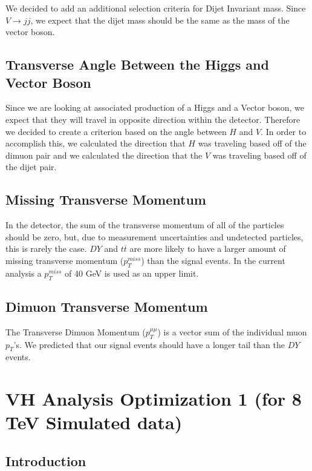 \documentclass[12pt]{article}
\begin{document}
We decided to add an additional selection criteria for Dijet Invariant mass. 
Since $V \rightarrow jj$, we expect that the dijet mass should be the same as the mass of the vector boson.

\subsection{Transverse Angle Between the Higgs and Vector Boson}

Since we are looking at associated production of a Higgs and a Vector boson, we expect that they will travel in opposite direction within the detector. 
Therefore we decided to create a criterion based on the angle between $H$ and $V$. 
In order to accomplish this, we calculated the direction that $H$ was traveling based off of the dimuon pair 
and we calculated the direction that the $V$ was traveling based off of the dijet pair. 

\subsection{Missing Transverse Momentum}

In the detector, the sum of the transverse momentum of all of the particles should be zero, 
but, due to measurement uncertainties and undetected particles, this is rarely the case. 
$DY$ and $t\overline{t}$ are more likely to have a larger amount of missing transverse momentum ($p_{T}^{miss}$) than the signal events. In the current analysis a $p_{T}^{miss}$ of 40 GeV is used as an upper limit.

\subsection{Dimuon Transverse Momentum}

The Transverse Dimuon Momentum ($p_{T}^{\mu \mu}$) is a vector sum of the individual muon $p_{T}$'s. We predicted that our signal events should have a longer tail than the $DY$ events.

\section{VH Analysis Optimization 1 (for 8 TeV Simulated data)}

\subsection{Introduction}
\end{document}
